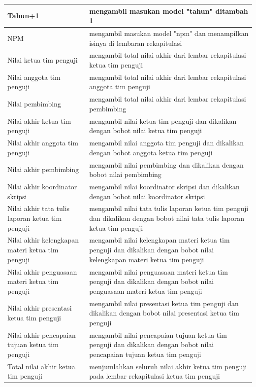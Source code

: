 \begin{itemize}
\begin{table}[H]
\begin{tabular}{| m{5cm} | m{10cm} |}
				\hline
				Tahun+1 & mengambil masukan model "tahun" ditambah 1\\
				\hline
				NPM & mengambil masukan model "npm" dan menampilkan isinya di lembaran rekapitulasi\\
				\hline
				Nilai ketua tim penguji & mengambil total nilai akhir dari lembar rekapitulasi ketua tim penguji\\
				\hline
				Nilai anggota tim penguji & mengambil total nilai akhir dari lembar rekapitulasi anggota tim penguji\\
				\hline
				Nilai pembimbing & mengambil total nilai akhir dari lembar rekapitulasi pembimbing\\
				\hline
				Nilai akhir ketua tim penguji & mengambil nilai ketua tim penguji dan dikalikan dengan bobot nilai ketua tim penguji\\
				\hline
				Nilai akhir anggota tim penguji & mengambil nilai anggota tim penguji dan dikalikan dengan bobot anggota ketua tim penguji\\
				\hline
				Nilai akhir pembimbing & mengambil nilai pembimbing dan dikalikan dengan bobot nilai pembimbing\\
				\hline
				Nilai akhir koordinator skripsi & mengambil nilai koordinator skripsi dan dikalikan dengan bobot nilai koordinator skripsi\\
				\hline
				Nilai akhir tata tulis laporan ketua tim penguji & mengambil nilai tata tulis laporan ketua tim penguji dan dikalikan dengan bobot nilai tata tulis laporan ketua tim penguji\\
				\hline
				Nilai akhir kelengkapan materi ketua tim penguji & mengambil nilai kelengkapan materi ketua tim penguji dan dikalikan dengan bobot nilai kelengkapan materi ketua tim penguji\\
				\hline
				Nilai akhir penguasaan materi ketua tim penguji & mengambil nilai penguasaan materi ketua tim penguji dan dikalikan dengan bobot nilai penguasaan materi ketua tim penguji\\
				\hline
				Nilai akhir presentasi ketua tim penguji & mengambil nilai presentasi ketua tim penguji dan dikalikan dengan bobot nilai presentasi ketua tim penguji\\
				\hline
				Nilai akhir pencapaian tujuan ketua tim penguji & mengambil nilai pencapaian tujuan ketua tim penguji dan dikalikan dengan bobot nilai pencapaian tujuan ketua tim penguji\\
				\hline
				Total nilai akhir ketua tim penguji & menjumlahkan seluruh nilai akhir ketua tim penguji pada lembar rekapitulasi ketua tim penguji\\

\end{tabular}
\end{table}
\end{itemize}
